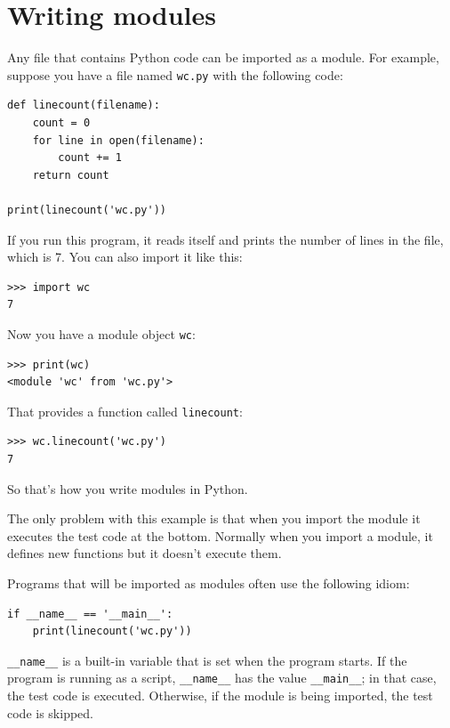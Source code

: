 \documentclass[10pt]{book}
\begin{document}
\section{Writing modules}
\label{modules}


Any file that contains Python code can be imported as a module.
For example, suppose you have a file named {\tt wc.py} with the following
code:

\beforeverb
\begin{verbatim}
def linecount(filename):
    count = 0
    for line in open(filename):
        count += 1
    return count

print(linecount('wc.py'))
\end{verbatim}
\afterverb
%
If you run this program, it reads itself and prints the number
of lines in the file, which is 7.
You can also import it like this:

\beforeverb
\begin{verbatim}
>>> import wc
7
\end{verbatim}
\afterverb
%
Now you have a module object {\tt wc}:


\beforeverb
\begin{verbatim}
>>> print(wc)
<module 'wc' from 'wc.py'>
\end{verbatim}
\afterverb
%
That provides a function called \verb"linecount":

\beforeverb
\begin{verbatim}
>>> wc.linecount('wc.py')
7
\end{verbatim}
\afterverb
%
So that's how you write modules in Python.

The only problem with this example is that when you import
the module it executes the test code at the bottom.  Normally
when you import a module, it defines new functions but it
doesn't execute them.


Programs that will be imported as modules often
use the following idiom:

\beforeverb
\begin{verbatim}
if __name__ == '__main__':
    print(linecount('wc.py'))
\end{verbatim}
\afterverb
%
\verb"__name__" is a built-in variable that is set when the
program starts.  If the program is running as a script,
\verb"__name__" has the value \verb"__main__"; in that
case, the test code is executed.  Otherwise,
if the module is being imported, the test code is skipped.
\end{document}
